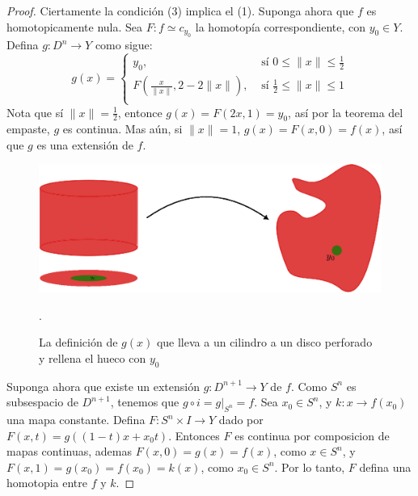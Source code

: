 \begin{proof}
    Ciertamente la condici\'on (3) implica el (1). Suponga ahora que $f$ es
    homotopicamente nula. Sea  $F:f \simeq c_{y_0}$ la homotop\'ia
    correspondiente, con $y_0 \in Y$. Defina $g:D^{n} \xrightarrow{} Y$ como
    sigue:
    \begin{equation*}
     g(x)=\begin{cases}
            y_0,    &   \text{ s\'i } 0 \leq \|x\| \leq \frac{1}{2} \\
            F(\frac{x}{\|x\|},2-2\|x\|), & \text{ s\'i } \frac{1}{2} \leq \|x\| \leq 1 \\
        \end{cases}
    \end{equation*}
    Nota que s\'i $\|x\|=\frac{1}{2}$, entonce $g(x)=F(2x,1)=y_0$, as\'i por la
    teorema del empaste, $g$ es continua. Mas a\'un, si  $\|x\|=1$,
    $g(x)=F(x,0)=f(x)$, as\'i que $g$ es una extensi\'on de  $f$.

    \begin{figure}[h]
        \centering
        \includegraphics[scale=0.5]{Figures/equiv_homotopy.eps}
        \caption{La definici\'on de $g(x)$ que lleva a un cilindro a un disco
        perforado y rellena el hueco con $y_0$}.
        \label{fig_12}
    \end{figure}

    Suponga ahora que existe un extensi\'on $g:D^{n+1} \xrightarrow{} Y$ de $f$.
    Como  $S^n$ es subsespacio de  $D^{n+1}$, tenemos que $g \circ
    i=g|_{S^n}=f$. Sea $x_0 \in S^n$, y $k:x \xrightarrow{} f(x_0)$ una mapa
    constante. Defina $F:S^n \times I \xrightarrow{} Y$ dado por
    $F(x,t)=g((1-t)x+x_0t)$. Entonces $F$ es continua por composicion de mapas
    continuas, ademas $F(x,0)=g(x)=f(x)$, como $x \in S^n$, y
    $F(x,1)=g(x_0)=f(x_0)=k(x)$, como $x_0 \in S^n$. Por lo tanto, $F$ defina
    una homotopia entre  $f$ y  $k$.
\end{proof}

